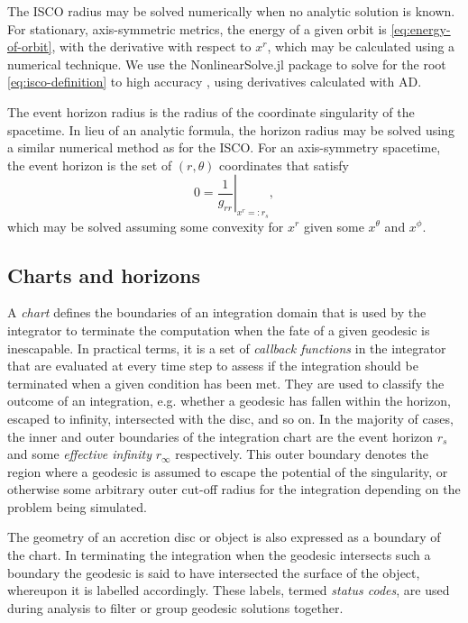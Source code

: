 \documentclass[fleqn,usenatbib]{mnras}
\begin{document}
The ISCO radius may be solved numerically when no analytic solution is known.
For stationary, axis-symmetric metrics, the energy of a given orbit is
\eqref{eq:energy-of-orbit}, with the derivative with respect to $x^r$, which may
be calculated using a numerical technique. We use the NonlinearSolve.jl package
to solve for the root \eqref{eq:isco-definition} to high accuracy
\citep{Pal_NonlinearSolve_jl_2023}, using derivatives calculated with AD.

The event horizon radius is the radius of the coordinate singularity of the
spacetime. In lieu of an analytic formula, the horizon radius may be solved
using a similar numerical method as for the ISCO. For an axis-symmetry
spacetime, the event horizon is the set of $(r, \theta)$ coordinates that
satisfy
\begin{equation}
    \label{eq:event_horizon}
    0 = \left. \frac{1}{g_{rr}} \right\rvert_{x^r =: r_s},
\end{equation}
which may be solved assuming some convexity for $x^r$ given some $x^\theta$ and
$x^\phi$.

\subsection{Charts and horizons}

A \emph{chart} defines the boundaries of an integration domain that is used by
the integrator to terminate the computation when the fate of a given geodesic is
inescapable. In practical terms, it is a set of \emph{callback functions} in the
integrator that are evaluated at every time step to assess if the integration
should be terminated when a given condition has been met. They are used to
classify the outcome of an integration, e.g. whether a geodesic has fallen within the
horizon, escaped to infinity, intersected with the disc, and so on. In the
majority of cases, the inner and outer boundaries of the integration chart are
the event horizon $r_s$ and some \emph{effective infinity} $r_\infty$
respectively. This outer boundary denotes the region where a geodesic is assumed
to escape the potential of the singularity, or otherwise some arbitrary
outer cut-off radius for the integration depending on the problem being
simulated.

The geometry of an accretion disc or object is also expressed as a boundary of
the chart. In terminating the integration when the geodesic intersects such a
boundary the geodesic is said to have intersected the surface of the object,
whereupon it is labelled accordingly. These labels, termed \emph{status codes},
are used during analysis to filter or group geodesic solutions together.
\end{document}
